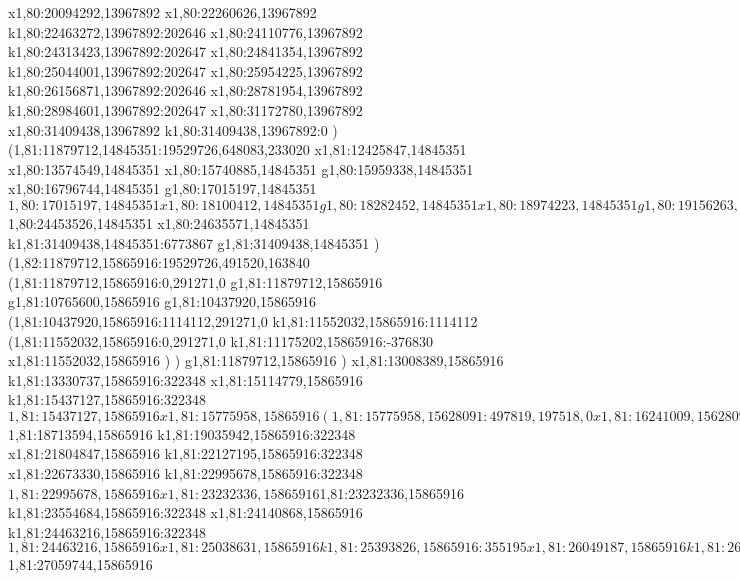 {x1,80:20094292,13967892
x1,80:22260626,13967892
k1,80:22463272,13967892:202646
x1,80:24110776,13967892
k1,80:24313423,13967892:202647
x1,80:24841354,13967892
k1,80:25044001,13967892:202647
x1,80:25954225,13967892
k1,80:26156871,13967892:202646
x1,80:28781954,13967892
k1,80:28984601,13967892:202647
x1,80:31172780,13967892
x1,80:31409438,13967892
k1,80:31409438,13967892:0
)
(1,81:11879712,14845351:19529726,648083,233020
x1,81:12425847,14845351
x1,80:13574549,14845351
x1,80:15740885,14845351
g1,80:15959338,14845351
x1,80:16796744,14845351
g1,80:17015197,14845351
$1,80:17015197,14845351
x1,80:18100412,14845351
g1,80:18282452,14845351
x1,80:18974223,14845351
g1,80:19156263,14845351
(1,80:19156263,14317419:309476,0,728185
x1,80:19465739,14317419
)
[1,80:19465739,15078371:358173,881103,0
(1,80:19593170,14479437:230742,282169,0
x1,80:19791144,14479437
)
(1,80:19465739,15078371:294003,295640,0
x1,80:19726974,15078371
)
]
g1,80:19933136,14845351
x1,80:20245722,14845351
x1,80:20831753,14845351
x1,80:22570053,14845351
g1,80:22715685,14845351
x1,80:23225411,14845351
g1,80:23371043,14845351
[1,80:23371043,14845351:336099,372098,127431
(1,80:23393457,14845351:0,372098,0
x1,80:23721138,14845351
)
(1,80:23371043,14845351:336099,282168,127431
x1,80:23683629,14845351
)
]
x1,80:24453526,14845351
$1,80:24453526,14845351
x1,80:24635571,14845351
k1,81:31409438,14845351:6773867
g1,81:31409438,14845351
)
(1,82:11879712,15865916:19529726,491520,163840
(1,81:11879712,15865916:0,291271,0
g1,81:11879712,15865916
g1,81:10765600,15865916
g1,81:10437920,15865916
(1,81:10437920,15865916:1114112,291271,0
k1,81:11552032,15865916:1114112
(1,81:11552032,15865916:0,291271,0
k1,81:11175202,15865916:-376830
x1,81:11552032,15865916
)
)
g1,81:11879712,15865916
)
x1,81:13008389,15865916
k1,81:13330737,15865916:322348
x1,81:15114779,15865916
k1,81:15437127,15865916:322348
$1,81:15437127,15865916
x1,81:15775958,15865916
(1,81:15775958,15628091:497819,197518,0
x1,81:16241009,15628091
)
x1,81:17020161,15865916
k1,81:17375356,15865916:355195
x1,81:18030717,15865916
k1,81:18385913,15865916:355196
x1,81:18713594,15865916
$1,81:18713594,15865916
k1,81:19035942,15865916:322348
x1,81:21804847,15865916
k1,81:22127195,15865916:322348
x1,81:22673330,15865916
k1,81:22995678,15865916:322348
$1,81:22995678,15865916
x1,81:23232336,15865916
$1,81:23232336,15865916
k1,81:23554684,15865916:322348
x1,81:24140868,15865916
k1,81:24463216,15865916:322348
$1,81:24463216,15865916
x1,81:25038631,15865916
k1,81:25393826,15865916:355195
x1,81:26049187,15865916
k1,81:26404383,15865916:355196
x1,81:27059744,15865916
$1,81:27059744,15865916
}
